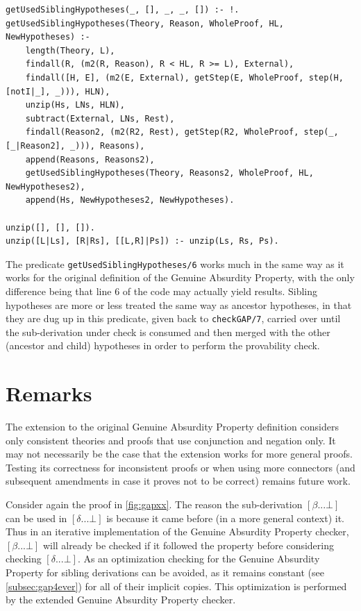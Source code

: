 \documentclass[11pt,twoside,a4paper]{report}
\begin{document}
\begin{lstlisting}[caption={Gathering of referenced sibling derivations for the extended Genuine Absurdity Property definition},label=lst:sibmining]
% Uses the line references to find referenced sibling derivations
getUsedSiblingHypotheses(_, [], _, _, []) :- !.
getUsedSiblingHypotheses(Theory, Reason, WholeProof, HL, NewHypotheses) :-
	length(Theory, L),
	findall(R, (m2(R, Reason), R < HL, R >= L), External),
	findall([H, E], (m2(E, External), getStep(E, WholeProof, step(H, [notI|_], _))), HLN),
	unzip(Hs, LNs, HLN),
	subtract(External, LNs, Rest),
	findall(Reason2, (m2(R2, Rest), getStep(R2, WholeProof, step(_, [_|Reason2], _))), Reasons),
	append(Reasons, Reasons2),
	getUsedSiblingHypotheses(Theory, Reasons2, WholeProof, HL, NewHypotheses2),
	append(Hs, NewHypotheses2, NewHypotheses).
	
unzip([], [], []).
unzip([L|Ls], [R|Rs], [[L,R]|Ps]) :- unzip(Ls, Rs, Ps).
\end{lstlisting}

The predicate \lstinline$getUsedSiblingHypotheses/6$ works much in the same way as it works for the original definition of the Genuine Absurdity Property, with the only difference being that line 6 of the code may actually yield results. Sibling hypotheses are more or less treated the same way as ancestor hypotheses, in that they are dug up in this predicate, given back to \lstinline$checkGAP/7$, carried over until the sub-derivation under check is consumed and then merged with the other (ancestor and child) hypotheses in order to perform the provability check.

\section{Remarks}
\label{sec:remarx}
The extension to the original Genuine Absurdity Property definition considers only consistent theories and proofs that use conjunction and negation only. It may not necessarily be the case that the extension works for more general proofs. Testing its correctness for inconsistent proofs or when using more connectors (and subsequent amendments in case it proves not to be correct) remains future work.

Consider again the proof in \autoref{fig:gapxx}. The reason the sub-derivation $[\beta ... \bot]$ can be used in $[\delta ... \bot]$ is because it came before (in a more general context) it. Thus in an iterative implementation of the Genuine Absurdity Property checker, $[\beta ... \bot]$ will already be checked if it followed the property before considering checking $[\delta ... \bot]$. As an optimization checking for the Genuine Absurdity Property for sibling derivations can be avoided, as it remains constant (see \autoref{subsec:gap4ever}) for all of their implicit copies. This optimization is performed by the extended Genuine Absurdity Property checker.
\end{document}
